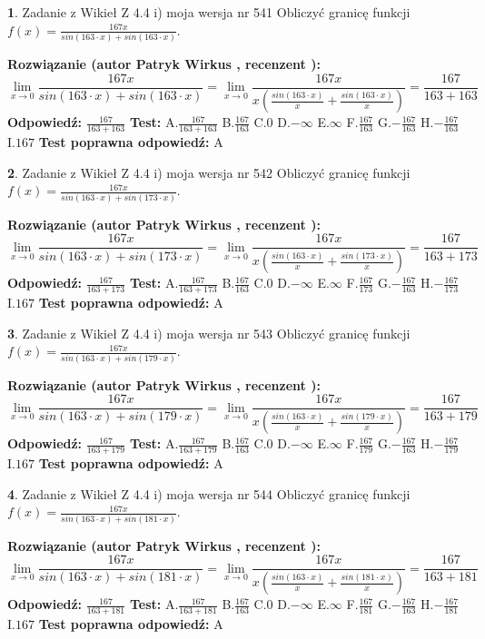 \documentclass[12pt, a4paper]{article}
\theoremstyle{definition} %
\newtheorem{zad}{}
\newcommand{\zadStart}[1]{\begin{zad}#1\newline}
\newcommand{\zadStop}{\end{zad}}
\newcommand{\rozwStart}[2]{\noindent \textbf{Rozwiązanie (autor #1 , recenzent #2): }\newline}
\newcommand{\rozwStop}{\newline}
\newcommand{\odpStart}{\noindent \textbf{Odpowiedź:}\newline}
\newcommand{\odpStop}{\newline}
\newcommand{\testStart}{\noindent \textbf{Test:}\newline}
\newcommand{\testStop}{\newline}
\newcommand{\kluczStart}{\noindent \textbf{Test poprawna odpowiedź:}\newline}
\newcommand{\kluczStop}{\newline}
\begin{document}
\zadStart{Zadanie z Wikieł Z 4.4 i) moja wersja nr 541}
Obliczyć granicę funkcji $f(x)=\frac{167x}{sin(163\cdot x) +sin(163\cdot x)}$.
\zadStop
\rozwStart{Patryk Wirkus}{}
$$\lim\limits_{x\to 0}\frac{167x}{sin(163\cdot x) +sin(163\cdot x)}=\lim\limits_{x\to 0}\frac{167x}{x(\frac{sin(163\cdot x)}{x}+\frac{sin(163\cdot x)}{x})}=\frac{167}{163+163}$$
\rozwStop
\odpStart
$\frac{167}{163+163}$
\odpStop
\testStart
A.$\frac{167}{163+163}$
B.$\frac{167}{163}$
C.$0$
D.$-\infty$
E.$\infty$
F.$\frac{167}{163}$
G.$-\frac{167}{163}$
H.$-\frac{167}{163}$
I.$167$
\testStop
\kluczStart
A
\kluczStop



\zadStart{Zadanie z Wikieł Z 4.4 i) moja wersja nr 542}
Obliczyć granicę funkcji $f(x)=\frac{167x}{sin(163\cdot x) +sin(173\cdot x)}$.
\zadStop
\rozwStart{Patryk Wirkus}{}
$$\lim\limits_{x\to 0}\frac{167x}{sin(163\cdot x) +sin(173\cdot x)}=\lim\limits_{x\to 0}\frac{167x}{x(\frac{sin(163\cdot x)}{x}+\frac{sin(173\cdot x)}{x})}=\frac{167}{163+173}$$
\rozwStop
\odpStart
$\frac{167}{163+173}$
\odpStop
\testStart
A.$\frac{167}{163+173}$
B.$\frac{167}{163}$
C.$0$
D.$-\infty$
E.$\infty$
F.$\frac{167}{173}$
G.$-\frac{167}{163}$
H.$-\frac{167}{173}$
I.$167$
\testStop
\kluczStart
A
\kluczStop



\zadStart{Zadanie z Wikieł Z 4.4 i) moja wersja nr 543}
Obliczyć granicę funkcji $f(x)=\frac{167x}{sin(163\cdot x) +sin(179\cdot x)}$.
\zadStop
\rozwStart{Patryk Wirkus}{}
$$\lim\limits_{x\to 0}\frac{167x}{sin(163\cdot x) +sin(179\cdot x)}=\lim\limits_{x\to 0}\frac{167x}{x(\frac{sin(163\cdot x)}{x}+\frac{sin(179\cdot x)}{x})}=\frac{167}{163+179}$$
\rozwStop
\odpStart
$\frac{167}{163+179}$
\odpStop
\testStart
A.$\frac{167}{163+179}$
B.$\frac{167}{163}$
C.$0$
D.$-\infty$
E.$\infty$
F.$\frac{167}{179}$
G.$-\frac{167}{163}$
H.$-\frac{167}{179}$
I.$167$
\testStop
\kluczStart
A
\kluczStop



\zadStart{Zadanie z Wikieł Z 4.4 i) moja wersja nr 544}
Obliczyć granicę funkcji $f(x)=\frac{167x}{sin(163\cdot x) +sin(181\cdot x)}$.
\zadStop
\rozwStart{Patryk Wirkus}{}
$$\lim\limits_{x\to 0}\frac{167x}{sin(163\cdot x) +sin(181\cdot x)}=\lim\limits_{x\to 0}\frac{167x}{x(\frac{sin(163\cdot x)}{x}+\frac{sin(181\cdot x)}{x})}=\frac{167}{163+181}$$
\rozwStop
\odpStart
$\frac{167}{163+181}$
\odpStop
\testStart
A.$\frac{167}{163+181}$
B.$\frac{167}{163}$
C.$0$
D.$-\infty$
E.$\infty$
F.$\frac{167}{181}$
G.$-\frac{167}{163}$
H.$-\frac{167}{181}$
I.$167$
\testStop
\kluczStart
A
\kluczStop
\end{document}
